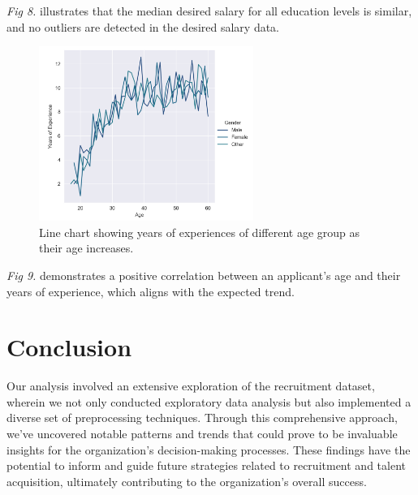 \documentclass[journal]{IEEEtai}
\begin{document}
{\it Fig 8.} illustrates that the median desired salary for all education levels is similar, and no outliers are detected in the desired salary data.


\begin{figure}[h]
\centerline{\includegraphics[width=16.5pc]{figures/LineChartN.png}}
\caption{Line chart showing years of experiences of different age group as their age increases.}
\end{figure}

{\it Fig 9.} demonstrates a positive correlation between an applicant's age and their years of experience, which aligns with the expected trend.













\section{Conclusion}
Our analysis involved an extensive exploration of the recruitment dataset, wherein we not only conducted exploratory data analysis but also implemented a diverse set of preprocessing techniques. Through this comprehensive approach, we've uncovered notable patterns and trends that could prove to be invaluable insights for the organization's decision-making processes. These findings have the potential to inform and guide future strategies related to recruitment and talent acquisition, ultimately contributing to the organization's overall success.
\end{document}
